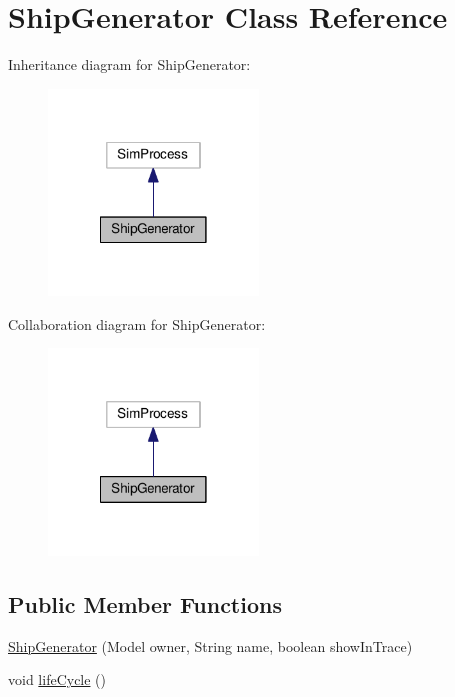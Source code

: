 \hypertarget{class_ship_generator}{\section{Ship\-Generator Class Reference}
\label{class_ship_generator}
}


Inheritance diagram for Ship\-Generator\-:
\nopagebreak
\begin{figure}[H]
\begin{center}
\leavevmode
\includegraphics[width=158pt]{class_ship_generator__inherit__graph}
\end{center}
\end{figure}


Collaboration diagram for Ship\-Generator\-:
\nopagebreak
\begin{figure}[H]
\begin{center}
\leavevmode
\includegraphics[width=158pt]{class_ship_generator__coll__graph}
\end{center}
\end{figure}
\subsection*{Public Member Functions}
\begin{DoxyCompactItemize}
\item 
\hyperlink{class_ship_generator_a0f5dd5eea4a965e376cdaa84109e7197}{Ship\-Generator} (Model owner, String name, boolean show\-In\-Trace)
\item 
void \hyperlink{class_ship_generator_a2a03df464499a472d8b385cfd2546f69}{life\-Cycle} ()
\end{DoxyCompactItemize}


